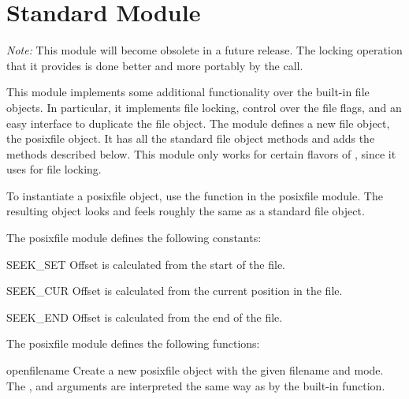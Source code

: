 \section{Standard Module }
\label{module-posixfile}

\emph{Note:} This module will become obsolete in a future release.
The locking operation that it provides is done better and more
portably by the  call.

This module implements some additional functionality over the built-in
file objects.  In particular, it implements file locking, control over
the file flags, and an easy interface to duplicate the file object.
The module defines a new file object, the posixfile object.  It
has all the standard file object methods and adds the methods
described below.  This module only works for certain flavors of
\UNIX{}, since it uses  for file locking.

To instantiate a posixfile object, use the  function in
the posixfile module.  The resulting object looks and feels roughly
the same as a standard file object.

The posixfile module defines the following constants:

\begin{datadesc}{SEEK_SET}
Offset is calculated from the start of the file.
\end{datadesc}

\begin{datadesc}{SEEK_CUR}
Offset is calculated from the current position in the file.
\end{datadesc}

\begin{datadesc}{SEEK_END}
Offset is calculated from the end of the file.
\end{datadesc}

The posixfile module defines the following functions:


\begin{funcdesc}{open}{filename}
 Create a new posixfile object with the given filename and mode.  The
 ,  and  arguments are
 interpreted the same way as by the built-in  function.
\end{funcdesc}

